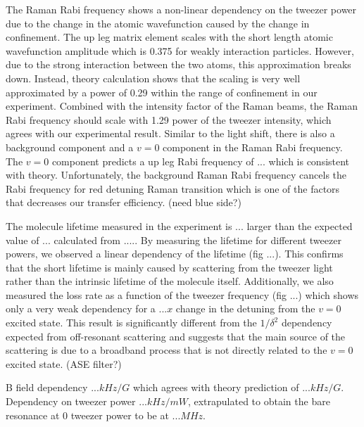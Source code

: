 \documentclass[aps,prl,twocolumn,groupedaddress]{revtex4-1}
\newcommand{\todo}[1]{}
\begin{document}
The Raman Rabi frequency shows a non-linear dependency on the tweezer power due to the change in the atomic wavefunction caused by the change in confinement. The up leg matrix element scales with the short length atomic wavefunction amplitude which is 0.375 for weakly interaction particles. However, due to the strong interaction between the two atoms, this approximation breaks down. Instead, theory calculation shows that the scaling is very well approximated by a power of 0.29 within the range of confinement in our experiment. Combined with the intensity factor of the Raman beams, the Raman Rabi frequency should scale with 1.29 power of the tweezer intensity, which agrees with our experimental result. Similar to the light shift, there is also a background component and a $v=0$ component in the Raman Rabi frequency. The $v=0$ component predicts a up leg Rabi frequency of $...$ which is consistent with theory. Unfortunately, the background Raman Rabi frequency cancels the Rabi frequency for red detuning Raman transition which is one of the factors that decreases our transfer efficiency. (need blue side?)





The molecule lifetime measured in the experiment is $...$ larger than the expected value of $...$ calculated from ..... By measuring the lifetime for different tweezer powers, we observed a linear dependency of the lifetime (fig ...). This confirms that the short lifetime is mainly caused by scattering from the tweezer light rather than the intrinsic lifetime of the molecule itself. Additionally, we also measured the loss rate as a function of the tweezer frequency (fig ...) which shows only a very weak dependency for a $...x$ change in the detuning from the $v=0$ excited state. This result is significantly different from the $1/\delta^2$ dependency expected from off-resonant scattering and suggests that the main source of the scattering is due to a broadband process that is not directly related to the $v=0$ excited state. (ASE filter?)










B field dependency $... kHz/G$ which agrees with theory prediction of $... kHz/G$.
Dependency on tweezer power $... kHz/mW$, extrapulated to obtain the bare resonance at $0$ tweezer power to be at $... MHz$.

\todo{sm: STIRAP vs Raman}


\end{document}
